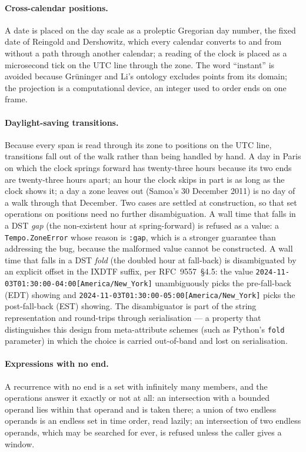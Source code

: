 \paragraph*{Cross-calendar positions.} A date is placed on the day
scale as a proleptic Gregorian day number, the fixed date of Reingold
and Dershowitz, which every calendar converts to and from without a
path through another calendar; a reading of the clock is placed as a
microsecond tick on the UTC line through the zone. The word ``instant''
is avoided because Gr\"uninger and Li's ontology excludes points from
its domain; the projection is a computational device, an integer used
to order ends on one frame.

\paragraph*{Daylight-saving transitions.} Because every span is read
through its zone to positions on the UTC line, transitions fall out of
the walk rather than being handled by hand. A day in Paris on which the
clock springs forward has twenty-three hours because its two ends are
twenty-three hours apart; an hour the clock skips in part is as long as
the clock shows it; a day a zone leaves out (Samoa's 30 December 2011)
is no day of a walk through that December. Two cases are settled at
construction, so that set operations on positions need no further
disambiguation. A wall time that falls in a DST \emph{gap} (the
non-existent hour at spring-forward) is refused as a value: a
\texttt{Tempo.ZoneError} whose reason is \texttt{:gap}, which is a
stronger guarantee than addressing the bug, because the malformed value
cannot be constructed. A wall time that falls in a DST \emph{fold} (the
doubled hour at fall-back) is disambiguated by an explicit offset in
the IXDTF suffix, per RFC~9557~\S 4.5: the value
\texttt{2024-11-03T01:30:00-04:00[America/New\_York]} unambiguously
picks the pre-fall-back (EDT) showing and
\texttt{2024-11-03T01:30:00-05:00[America/New\_York]} picks the
post-fall-back (EST) showing. The disambiguator is part of the string
representation and round-trips through serialisation --- a property
that distinguishes this design from meta-attribute schemes (such as
Python's \texttt{fold} parameter) in which the choice is carried
out-of-band and lost on serialisation.

\paragraph*{Expressions with no end.} A recurrence with no end is a set
with infinitely many members, and the operations answer it exactly or
not at all: an intersection with a bounded operand lies within that
operand and is taken there; a union of two endless operands is an
endless set in time order, read lazily; an intersection of two endless
operands, which may be searched for ever, is refused unless the caller
gives a window.

